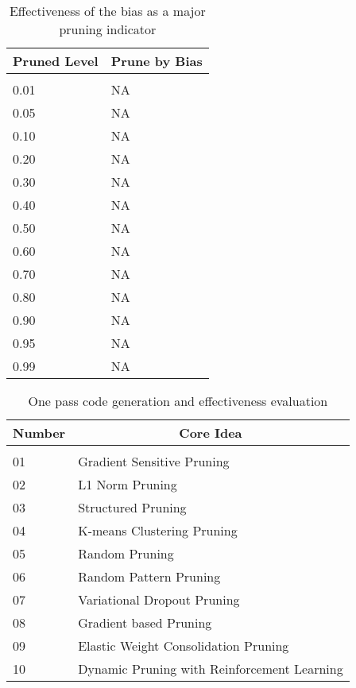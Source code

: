 \documentclass{article} %
\begin{document}
\begin{table}[t]
\caption{Effectiveness of the bias as a major pruning indicator}
\label{sample-table-3}
\begin{center}
\begin{tabular}{ll}
\multicolumn{1}{c}{\bf Pruned Level}  &\multicolumn{1}{c}{\bf Prune by Bias}
\\ \hline \\
0.01         &NA \\
0.05         &NA \\
0.10         &NA \\
0.20         &NA \\
0.30         &NA \\
0.40         &NA \\
0.50         &NA \\
0.60         &NA \\
0.70         &NA \\
0.80         &NA \\
0.90         &NA \\
0.95         &NA \\
0.99         &NA \\
\end{tabular}
\end{center}
\end{table}

\begin{table}[t]
\caption{One pass code generation and effectiveness evaluation}
\label{sample-table-4}
\begin{center}
\begin{tabular}{ll}
\multicolumn{1}{c}{\bf Number}  &\multicolumn{1}{c}{\bf Core Idea}
\\ \hline \\
01         &Gradient Sensitive Pruning \\
02         &L1 Norm Pruning \\
03         &Structured Pruning \\
04         &K-means Clustering Pruning \\
05         &Random Pruning \\
06         &Random Pattern Pruning \\
07         &Variational Dropout Pruning \\
08         &Gradient based Pruning \\
09         &Elastic Weight Consolidation Pruning \\
10         &Dynamic Pruning with Reinforcement Learning \\
\end{tabular}
\end{center}
\end{table}
\end{document}
